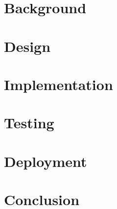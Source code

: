\part{Background}




\part{Design}





\part{Implementation}


\part{Testing}


\part{Deployment}


\part{Conclusion}



